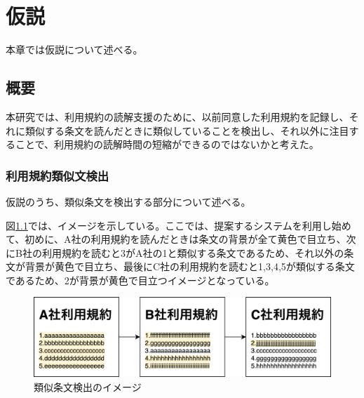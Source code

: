 \chapter{仮説}
\label{proposed}

本章では仮説について述べる。

\section{概要}
本研究では、利用規約の読解支援のために、以前同意した利用規約を記録し、それに類似する条文を読んだときに類似していることを検出し、それ以外に注目することで、利用規約の読解時間の短縮ができるのではないかと考えた。

\subsection{利用規約類似文検出}
\label{sub:利用規約類似文検出}
仮説のうち、類似条文を検出する部分について述べる。

図\ref{img:demo}では、イメージを示している。ここでは、提案するシステムを利用し始めて、初めに、A社の利用規約を読んだときは条文の背景が全て黄色で目立ち、次にB社の利用規約を読むと3がA社の1と類似する条文であるため、それ以外の条文が背景が黄色で目立ち、最後にC社の利用規約を読むと1,3,4,5が類似する条文であるため、2が背景が黄色で目立つイメージとなっている。
\begin{figure}[h]
  \begin{center}
      \includegraphics[width=15cm]{img/demo.drawio.png}
      \caption{類似条文検出のイメージ}
      \label{img:demo}
  \end{center}
\end{figure}

